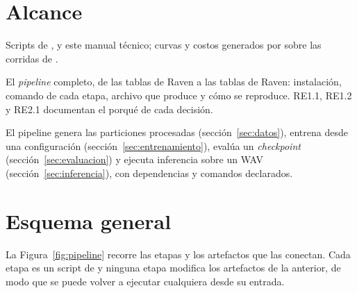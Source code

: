 \documentclass[12pt,a4paper]{article}
\begin{document}

\section{Alcance}

 Scripts de ,  y este manual
técnico; curvas y costos generados por  sobre las
corridas de .

 El \emph{pipeline} completo, de las tablas de Raven a las tablas de
Raven: instalación, comando de cada etapa, archivo que produce y cómo se reproduce. RE1.1,
RE1.2 y RE2.1 documentan el porqué de cada decisión.

 El pipeline genera las particiones procesadas (sección~\ref{sec:datos}),
entrena desde una configuración (sección~\ref{sec:entrenamiento}), evalúa un
\emph{checkpoint} (sección~\ref{sec:evaluacion}) y ejecuta inferencia sobre un WAV
(sección~\ref{sec:inferencia}), con dependencias y comandos declarados.

\section{Esquema general}

La Figura~\ref{fig:pipeline} recorre las etapas y los artefactos que las conectan. Cada
etapa es un script de  y ninguna etapa modifica los
artefactos de la anterior, de modo que se puede volver a ejecutar cualquiera desde su entrada.
\end{document}
